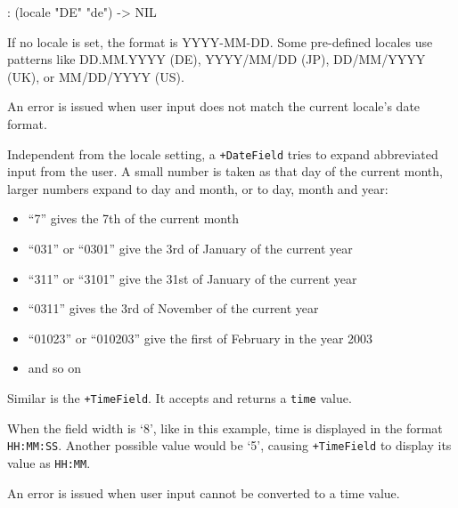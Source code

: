 \begin{wideverbatim}
: (locale "DE" "de")
-> NIL
\end{wideverbatim}

If no locale is set, the format is YYYY-MM-DD. Some pre-defined locales
use patterns like DD.MM.YYYY (DE), YYYY/MM/DD (JP), DD/MM/YYYY (UK), or
MM/DD/YYYY (US).

An error is issued when user input does not match the current locale's
date format.

Independent from the locale setting, a \texttt{+DateField} tries to expand
abbreviated input from the user. A small number is taken as that day of
the current month, larger numbers expand to day and month, or to day,
month and year:

\begin{itemize}
\item ``7'' gives the 7th of the current month
\item ``031'' or ``0301'' give the 3rd of January of the current year
\item ``311'' or ``3101'' give the 31st of January of the current year
\item ``0311'' gives the 3rd of November of the current year
\item ``01023'' or ``010203'' give the first of February in the year 2003
\item and so on
\end{itemize}

Similar is the \texttt{+TimeField}. It accepts and returns a \texttt{time} value.



When the field width is `8', like in this example, time is displayed in
the format \texttt{HH:MM:SS}. Another possible value would be `5', causing
\texttt{+TimeField} to display its value as \texttt{HH:MM}.

An error is issued when user input cannot be converted to a time value.

